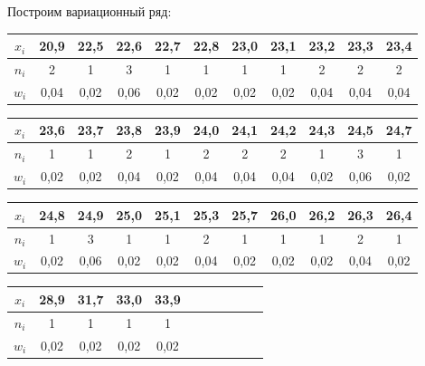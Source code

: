 \documentclass[utf8, a4paper, 14pt, russian, oneside]{book}
\begin{document}
Построим вариационный ряд:
\begin{table}[h!]
    \begin{tabular}{|c|c|c|c|c|c|c|c|c|c|c|}
        \hline
        $x_i$ & 20,9 & 22,5 & 22,6 & 22,7 & 22,8 & 23,0 & 23,1 & 23,2 & 23,3 & 23,4 \\
        \hline
        $n_i$ & 2 & 1 & 3 & 1 & 1 & 1 & 1 & 2 & 2 & 2\\
        \hline
        $w_i$ & 0,04 & 0,02 & 0,06 & 0,02 & 0,02 & 0,02 & 0,02 & 0,04 & 0,04 & 0,04 \\
        \hline
    \end{tabular}
\end{table}
\begin{table}[h!]
    \begin{tabular}{|c|c|c|c|c|c|c|c|c|c|c|}
        \hline
        $x_i$ & 23,6 & 23,7 & 23,8 & 23,9 & 24,0 & 24,1 & 24,2 & 24,3 & 24,5 & 24,7 \\
        \hline
        $n_i$ & 1 & 1 & 2 & 1 & 2 & 2 & 2 & 1 & 3 & 1 \\
        \hline
        $w_i$ & 0,02 & 0,02 & 0,04 & 0,02 & 0,04 & 0,04 & 0,04 & 0,02 & 0,06 & 0,02 \\
        \hline
    \end{tabular}
\end{table}
\newpage
\begin{table}[h!]
    \begin{tabular}{|c|c|c|c|c|c|c|c|c|c|c|}
        \hline
        $x_i$ & 24,8 & 24,9 & 25,0 & 25,1 & 25,3 & 25,7 & 26,0 & 26,2 & 26,3 & 26,4 \\
        \hline
        $n_i$ & 1 & 3 & 1 & 1 & 2 & 1 & 1 & 1 & 2 & 1 \\
        \hline
        $w_i$ & 0,02 & 0,06 & 0,02 & 0,02 & 0,04 & 0,02 & 0,02 & 0,02 & 0,04 & 0,02 \\
        \hline
    \end{tabular}
\end{table}
\begin{table}[h!]
    \begin{tabular}{|c|c|c|c|c|c|c|c|c|c|c|}
        \hline
        $x_i$ & 28,9 & 31,7 & 33,0 & 33,9\\
        \hline
        $n_i$ & 1 & 1 & 1 & 1 \\
        \hline
        $w_i$ & 0,02 & 0,02 & 0,02 & 0,02 \\
        \hline
    \end{tabular}
\end{table}
\end{document}
